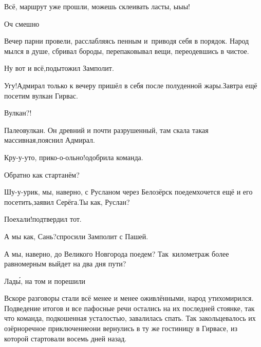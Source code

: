 \diagdash Всё, маршрут уже прошли, можешь склеивать ласты, ы\sdash ы\sdash ы!

\diagdash Оч смешно\myldots{}

\vspace{1em}
\myldots{}Вечер парни провели, расслабляясь пенным и~приводя себя в порядок. Народ мылся в душе, сбривал бороды, перепаковывал вещи, переодевшись в чистое.

\diagdash Ну вот и всё,\mdash подытожил Замполит.

\diagdash Угу!\mdash Адмирал только к вечеру пришёл в себя после полуденной жары.\mdash Завтра ещё посетим вулкан Гирвас.

\diagdash Вулкан?!

\diagdash Палеовулкан. Он древний и почти разрушенный, там скала такая массивная,\mdash пояснил Адмирал.

\diagdash Кру-у-уто, прико-о-ольно!\mdash одобрила команда.

\diagdash Обратно как стартанём?

\diagdash Шу-у-урик, мы, наверно, с Русланом через Белозёрск поедем\mdash хочется ещё и его посетить,\mdash заявил Серёга.\mdash Ты как, Руслан?

\diagdash Поехали!\mdash подтвердил тот.

\diagdash А мы как, Сань?\mdash спросили Замполит с Пашей.


\diagdash А мы, наверно, до Великого Новгорода поедем? Так~километраж более равномерным выйдет на два дня пути?

\diagdash Лад\'{ы}, на том и порешили\myldots{}

\vspace{0.2cm}
\myldots{}Вскоре разговоры стали всё менее и менее оживлёнными, народ утихомирился. Подведение итогов и все пафосные речи остались на их последней стоянке, так что команда, подкошенная усталостью, завалилась спать. Так закольцевалось их озёрно\sdash речное приключение\mdash они вернулись в ту же гостиницу в Гирвасе, из которой стартовали восемь дней назад.

\begin{center}
\end{center}
